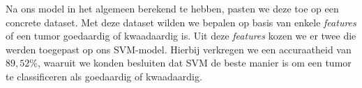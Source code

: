 \documentclass[twoside, kulak]{kulakreport}
\begin{document}
	Na ons model in het algemeen berekend te hebben, pasten we deze toe op een concrete dataset. Met deze dataset wilden we bepalen op basis van enkele \textit{features} of een tumor goedaardig of kwaadaardig is. Uit deze \textit{features} kozen we er twee die werden toegepast op ons SVM-model. Hierbij verkregen we een accuraatheid van \(89,52\%\), waaruit we konden besluiten dat SVM de beste manier is om een tumor te classificeren als goedaardig of kwaadaardig.
	
	\nocite{enwiki:1183475870}
	\nocite{mediumarticle}
	\nocite{bzdok2018machine}
	
	
	
	
\end{document}
